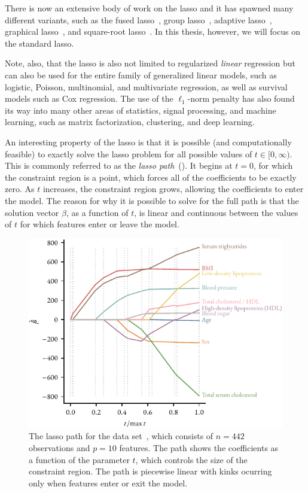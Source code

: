 There is now an extensive body of work on the lasso and it has spawned many different variants, such as the fused lasso~\parencite{tibshirani2005}, group lasso~\parencite{yuan2005}, adaptive lasso~\parencite{zou2006}, graphical lasso~\parencite{friedman2008}, and square-root lasso~\parencite{belloni2011}. In this thesis, however, we will focus on the standard lasso.

Note, also, that the lasso is also not limited to regularized \emph{linear} regression but can also be used for the entire family of generalized linear models, such as logistic, Poisson, multinomial, and multivariate regression, as well as survival models such as Cox regression. The use of the \(\ell_1\)-norm penalty has also found its way into many other areas of statistics, signal processing, and machine learning, such as matrix factorization, clustering, and deep learning.

An interesting property of the lasso is that it is possible (and computationally feasible) to exactly solve the lasso problem for all possible values of \(t \in [0, \infty)\). This is commonly referred to as the \emph{lasso path}~(). It begins at \(t=0\), for which the constraint region is a point, which forces all of the coefficients to be exactly zero. As \(t\) increases, the constraint region grows, allowing the coefficients to enter the model. The reason for why it is possible to solve for the full path is that the solution vector \(\beta\), as a function of \(t\), is linear and continuous between the values of \(t\) for which features enter or leave the model.

\begin{figure}
  \centering
  \includegraphics[]{figures/lasso-path.pdf}
  \caption{%
    The lasso path for the  data set~\parencite{efron2004}, which consists of \(n=442\) observations and \(p=10\) features. The path shows the coefficients as a function of the parameter \(t\), which controls the size of the constraint region. The path is piecewise linear with kinks ocurring only when features enter or exit the model.}
  \label{fig:lasso-path}
\end{figure}

